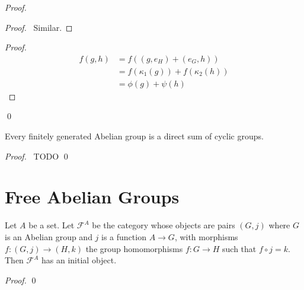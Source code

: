 \begin{proof}
    \begin{proof}
        \pf\ Similar.
    \end{proof}
    \begin{proof}
        \pf
        \begin{align*}
            f(g,h) & = f((g,e_H) + (e_G,h))            \\
                   & = f(\kappa_1(g)) + f(\kappa_2(h)) \\
                   & = \phi(g) + \psi(h)
        \end{align*}
    \end{proof}
    \qed
\end{proof}

\begin{thm}
Every finitely generated Abelian group is a direct sum of cyclic groups.
\end{thm}

\begin{proof}
\pf\ TODO \qed
\end{proof}

\section{Free Abelian Groups}

\begin{prop}
    Let $A$ be a set. Let $\mathcal{F}^A$ be the category whose objects are pairs $(G,j)$ where $G$ is an Abelian group and $j$ is a function $A \rightarrow G$, with morphisms $f : (G,j) \rightarrow (H,k)$ the group homomorphisms $f : G \rightarrow H$ such that $f \circ j = k$. Then $\mathcal{F}^A$ has an initial object.
\end{prop}

\begin{proof}
    \pf
    \qed
\end{proof}


